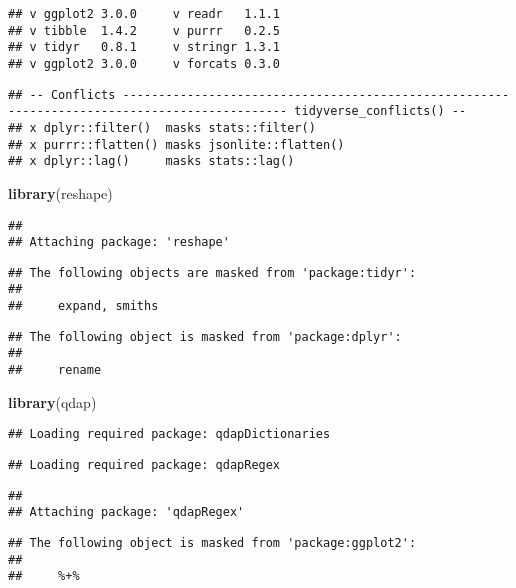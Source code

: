 \documentclass[]{article}
\newenvironment{Shaded}{\begin{snugshade}}{\end{snugshade}}
\newcommand{\KeywordTok}[1]{\textcolor[rgb]{0.13,0.29,0.53}{\textbf{#1}}}
\newcommand{\NormalTok}[1]{#1}
\begin{document}
\begin{verbatim}
## v ggplot2 3.0.0     v readr   1.1.1
## v tibble  1.4.2     v purrr   0.2.5
## v tidyr   0.8.1     v stringr 1.3.1
## v ggplot2 3.0.0     v forcats 0.3.0
\end{verbatim}

\begin{verbatim}
## -- Conflicts --------------------------------------------------------------------------------------------- tidyverse_conflicts() --
## x dplyr::filter()  masks stats::filter()
## x purrr::flatten() masks jsonlite::flatten()
## x dplyr::lag()     masks stats::lag()
\end{verbatim}

\begin{Shaded}
\begin{Highlighting}[]
\KeywordTok{library}\NormalTok{(reshape)}
\end{Highlighting}
\end{Shaded}

\begin{verbatim}
## 
## Attaching package: 'reshape'
\end{verbatim}

\begin{verbatim}
## The following objects are masked from 'package:tidyr':
## 
##     expand, smiths
\end{verbatim}

\begin{verbatim}
## The following object is masked from 'package:dplyr':
## 
##     rename
\end{verbatim}

\begin{Shaded}
\begin{Highlighting}[]
\KeywordTok{library}\NormalTok{(qdap)}
\end{Highlighting}
\end{Shaded}

\begin{verbatim}
## Loading required package: qdapDictionaries
\end{verbatim}

\begin{verbatim}
## Loading required package: qdapRegex
\end{verbatim}

\begin{verbatim}
## 
## Attaching package: 'qdapRegex'
\end{verbatim}

\begin{verbatim}
## The following object is masked from 'package:ggplot2':
## 
##     %+%
\end{verbatim}
\end{document}
